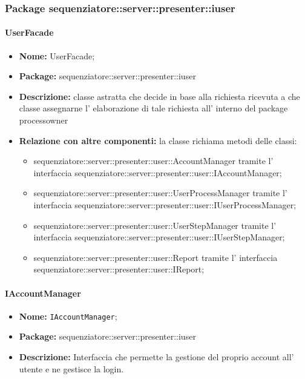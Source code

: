 \subsubsection{Package sequenziatore::server::presenter::iuser}
\paragraph{UserFacade}
	\begin{itemize}
		\item \textbf{Nome:} UserFacade;
		\item \textbf{Package:} sequenziatore::server::presenter::iuser
		\item \textbf{Descrizione:} classe astratta che decide in base alla richiesta ricevuta a che classe assegnarne l' elaborazione di tale richiesta all' interno del package processowner
		\item \textbf{Relazione con altre componenti:} la classe richiama metodi delle classi:
		\begin{itemize}
			\item sequenziatore::server::presenter::user::AccountManager tramite l' interfaccia			sequenziatore::server::presenter::user::IAccountManager;
			\item sequenziatore::server::presenter::user::UserProcessManager tramite l' interfaccia sequenziatore::server::presenter::user::IUserProcessManager;
			\item sequenziatore::server::presenter::user::UserStepManager tramite l' interfaccia sequenziatore::server::presenter::user::IUserStepManager;
			\item sequenziatore::server::presenter::user::Report tramite l' interfaccia sequenziatore::server::presenter::user::IReport;
		\end{itemize}
	\end{itemize}
\paragraph{IAccountManager}
	\begin{itemize}
		\item \textbf{Nome:} \texttt{IAccountManager};
		\item \textbf{Package:} sequenziatore::server::presenter::iuser
		\item \textbf{Descrizione:} Interfaccia che permette la gestione del proprio account all' utente e ne gestisce la login.
	\end{itemize}
